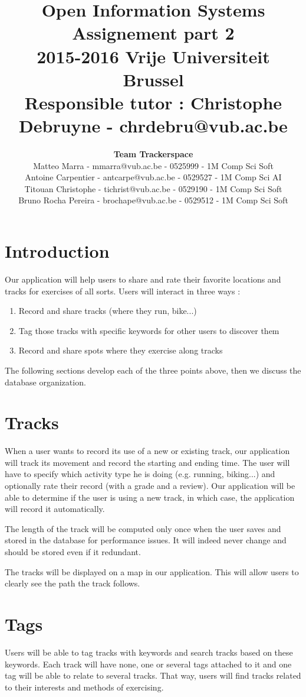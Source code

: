 \documentclass[a4paper]{article}
\title{\textbf{Open Information Systems\\Assignement part 2}\\2015-2016 Vrije Universiteit Brussel\\Responsible tutor : Christophe Debruyne - chrdebru@vub.ac.be}
\author{\textbf{Team Trackerspace}\\Matteo Marra - mmarra@vub.ac.be - 0525999 - 1M Comp Sci Soft\\Antoine Carpentier - antcarpe@vub.ac.be - 0529527 - 1M Comp Sci AI\\Titouan Christophe - tichrist@vub.ac.be - 0529190 - 1M Comp Sci Soft\\Bruno Rocha Pereira - brochape@vub.ac.be - 0529512 - 1M Comp Sci Soft}
\begin{document}
\maketitle

\section{Introduction}

Our application will help users to share and rate their favorite locations and tracks for exercises of all sorts. Users will interact in three ways : 

\begin{enumerate}
    \item Record and share tracks (where they run, bike...)
    \item Tag those tracks with specific keywords for other users to discover them
    \item Record and share spots where they exercise along tracks
\end{enumerate}

The following sections develop each of the three points above, then we discuss
the database organization.

\section{Tracks}

When a user wants to record its use of a new or existing track, our application will track its movement and record the starting and ending time. The user will have to specify which activity type he is doing (e.g. running, biking...) and optionally rate their record (with a grade and a review). Our application will be able to determine if the user is using a new track, in which case, the application will record it automatically.

The length of the track will be computed only once when the user saves and stored in the database for performance issues. It will indeed never change and should be stored even if it redundant.

The tracks will be displayed on a map in our application. This will allow users to clearly see the path the track follows.

\section{Tags}

Users will be able to tag tracks with keywords and search tracks based on these keywords. Each track will have none, one or several tags attached to it and one tag will be able to relate to several tracks. That way, users will find tracks related to their interests and methods of exercising.
\end{document}
